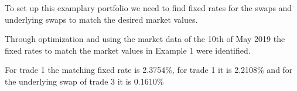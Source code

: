 To set up this examplary portfolio we need to find fixed rates for the
swaps and underlying swaps to match the desired market values.

    Through optimization and using the market data of the 10th of May 2019
the fixed rates to match the market values in Example 1 were identified.

    For trade 1 the matching fixed rate is 2.3754\%, for trade 1 it is
2.2108\% and for the underlying swap of trade 3 it is 0.1610\%

    


